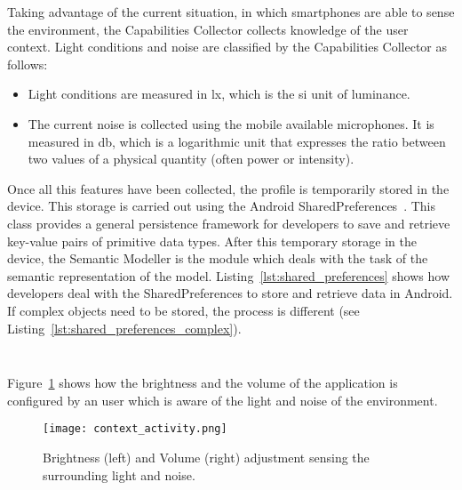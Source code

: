 Taking advantage of the current situation, in which smartphones are able to sense
the environment, the Capabilities Collector collects knowledge of the user context.
Light conditions and noise are classified by the Capabilities Collector as follows:

\begin{itemize}
 \item Light conditions are measured in \ac{lx}, which is the \ac{si} unit of 
 luminance.
 
 \item The current noise is collected using the mobile available microphones. It
 is measured in \ac{db}, which is a logarithmic unit that expresses the ratio
 between two values of a physical quantity (often power or intensity).
\end{itemize}

Once all this features have been collected, the profile is temporarily stored in 
the device. This storage is carried out using the Android 
SharedPreferences~\citep{shared_preferences}. This class provides a general 
persistence framework for developers to save and retrieve key-value pairs of 
primitive data types. After this temporary storage in the device, the Semantic 
Modeller is the module which deals with the task of the semantic representation 
of the model. Listing~\ref{lst:shared_preferences} shows how developers deal 
with the SharedPreferences to store and retrieve data in Android. If complex
objects need to be stored, the process is different (see Listing~\ref{lst:shared_preferences_complex}).

\inputminted[linenos=true, fontsize=\footnotesize, frame=lines]{java}{4_system_architecture/shared_preferences.java}

\inputminted[linenos=true, fontsize=\footnotesize, frame=lines]{java}{4_system_architecture/shared_preferences_complex.java}

Figure~\ref{fig:context_activity} shows how the brightness and the volume of
the application is configured by an user which is aware of the light and noise
of the environment.

\begin{figure}
\centering
\texttt{[image: context\_activity.png]}
\caption{Brightness (left) and Volume (right) adjustment sensing the surrounding
light and noise.}
\label{fig:context_activity}
\end{figure}


